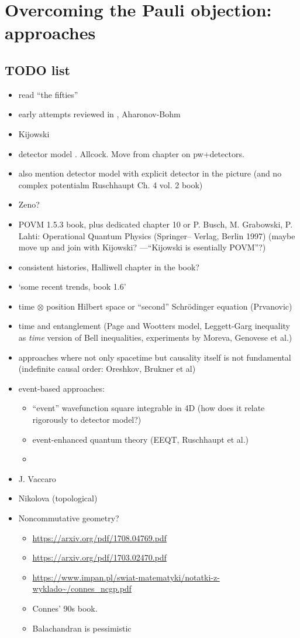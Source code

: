 \section{Overcoming the Pauli objection: approaches}

\subsection*{TODO list}
\begin{itemize}
\item read ``the fifties''
\item early attempts reviewed in \cite{TQM1, TQM2}, Aharonov-Bohm
\item Kijowski
\item detector model \cite{TQM1, TQM2}. Allcock. Move from chapter on pw+detectors.
\item also mention detector model with explicit detector in the picture (and no complex potentialm Ruschhaupt Ch. 4 vol. 2 book)
\item Zeno?
\item POVM 1.5.3 book, plus dedicated chapter 10 or P. Busch, M. Grabowski, P. Lahti: Operational Quantum Physics (Springer–
Verlag, Berlin 1997) (maybe move up and join with Kijowski? ---``Kijowski is esentially POVM''?)
\item consistent histories, Halliwell chapter in the book?
\item `some recent trends, book 1.6'
\item
    time $\otimes$ position Hilbert space or ``second'' Schr\"odinger equation (Prvanovic)
\item time and entanglement (Page and Wootters model, Leggett-Garg inequality as \emph{time} version of Bell inequalities, experiments by Moreva, Genovese et al.)
\item approaches where not only spacetime but causality itself is not fundamental (indefinite causal order: Oreshkov, Brukner et al)
\item event-based approaches:
  \begin{itemize}
    \item ``event'' wavefunction square integrable in 4D (how does it relate rigorously to detector model?)
    \item event-enhanced quantum theory (EEQT, Ruschhaupt et al.)
    \item
  \end{itemize}
\item J. Vaccaro
\item Nikolova (topological)
\item Noncommutative geometry?
\begin{itemize}
  \item \url{https://arxiv.org/pdf/1708.04769.pdf}
  \item \url{https://arxiv.org/pdf/1703.02470.pdf}
  \item \url{https://www.impan.pl/swiat-matematyki/notatki-z-wyklado~/connes_ncgp.pdf}
  \item Connes' 90s book.
  \item Balachandran is pessimistic
\end{itemize}
\end{itemize}
